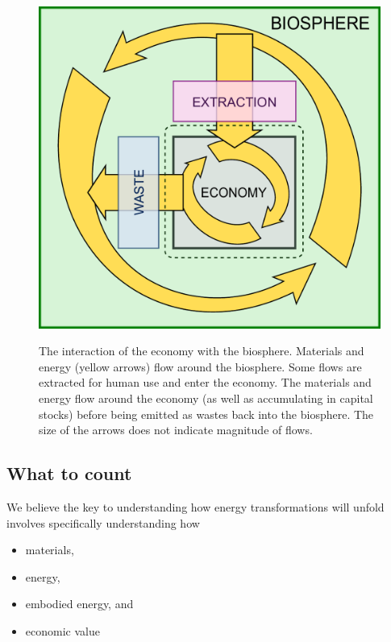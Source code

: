 \begin{figure}[!ht]
\centering\
\includegraphics[width=\linewidth]{Part_0/Chapter_Introduction/images/Biosphere_economy_v2.pdf}
\caption[The biosphere and the economy **** MCD - NEED A BETTER FIGURE TITLE ****]
				{The interaction of the economy with the biosphere.
				Materials and energy (yellow arrows) flow around the biosphere.
				Some flows are extracted for human use and enter the economy.
				The materials and energy flow around the economy 
				(as well as accumulating in capital stocks)
				before being emitted as wastes back into the biosphere.
				The size of the arrows does not indicate magnitude of flows.}
\label{fig:biosphere_economy}
\end{figure}


\subsection{What to count}
\label{sec:what_to_count}

We believe the key to understanding how energy transformations will unfold
involves specifically understanding how

\begin{itemize}
	\item{materials,}
	\item{energy,}
	\item{embodied energy, and}
	\item{economic value}
\end{itemize}

